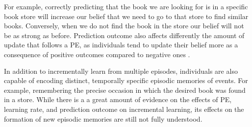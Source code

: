 \documentclass[a4paper,12pt]{article}
\begin{document}
For example, correctly predicting that the book we are looking for is in a specific book store will increase our belief that we need to go to that store to find similar books. Conversely, when we do not find the book in the store our belief will not be as strong as before. Prediction outcome also affects differently the amount of update that follows a PE, as individuals tend to update their belief more as a consequence of positive outcomes compared to negative ones \citep{Lefebvre2017, sharot2007neural, sharot2011unrealistic, sharot2016forming}.  \par
In addition to incrementally learn from multiple episodes, individuals are also capable of encoding distinct, temporally specific episodic memories of events. For example, remembering the precise occasion in which the desired book was found in a store. 
While there is a a great amount of evidence on the effects of PE, learning rate, and prediction outcome on incremental learning, its  effects on the formation of new episodic memories are still not fully understood.\par
\end{document}
